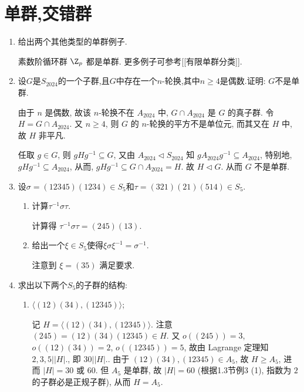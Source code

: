 \section{单群,交错群}
\begin{enumerate}
\item 给出两个其他类型的单群例子.
\begin{solution}
    素数阶循环群 $\Z_p$ 都是单群. 更多例子可参考[[有限单群分类]].
\end{solution}

\item 设$G$是$S_{2024}$的一个子群,且$G$中存在一个$n$-轮换,其中$n \geqslant 4$是偶数.证明: $G$不是单群.
\begin{solution}
    由于 $n$ 是偶数, 故该 $n$-轮换不在 $A_{2024}$ 中,
    $G\cap A_{2024}$ 是 $G$ 的真子群.
    令 $H=G\cap A_{2024}$.
    又 $n\geqslant 4$,
    则 $G$ 的 $n$-轮换的平方不是单位元, 而其又在 $H$ 中,
    故 $H$ 非平凡. 
    
    任取 $g\in G$,
    则 $gHg^{-1}\subseteq G$,
    又由 $A_{2024}\triangleleft S_{2024}$ 知 $gA_{2024}g^{-1}\subseteq A_{2024}$,
    特别地, $gHg^{-1}\subseteq A_{2024}$,
    从而, $gHg^{-1}\subseteq G\cap A_{2024} = H$.
    故 $H\triangleleft G$.
    从而 $G$ 不是单群. 
\end{solution}

\item 设$\sigma = (12345)(1234) \in S_{5}$和$\tau = (321)(21)(514) \in S_{5}$.
\begin{enumerate}[label=(\arabic*)]
\item 计算$\tau^{-1}\sigma\tau$.
\begin{solution}
    计算得 $\tau^{-1}\sigma\tau = (245)(13)$. 
\end{solution}
\item 给出一个$\xi \in S_{5}$使得$\xi\sigma\xi^{-1} = \sigma^{-1}$.
\begin{solution}
    注意到 $\xi = (35)$ 满足要求. 
\end{solution}

\end{enumerate}

\item 求出以下两个$S_{5}$的子群的结构:
\begin{enumerate}[label=(\arabic*)]
\item $\langle (12)(34), (12345) \rangle$;
\begin{solution}
    记 $H=\langle (12)(34), (12345) \rangle$.
    注意 $(245)=(12)(34)(12345) \in H$.
    又 $o\left( (245) \right)=3$, $o\left( (12)(34) \right)=2$, $o\left( (12345) \right)=5$,
    故由 Lagrange 定理知 $2,3,5\bigl| |H| \bigr.$,
    即 $30\bigl| |H| \bigr.$.
    由于 $(12)(34),(12345) \in A_5$,
    故 $H \geqslant A_5$,
    进而 $|H|=30$ 或 $60$.
    但 $A_5$ 是单群, 故 $|H|=60$
    (根据1.3节例3 (1), 指数为 $2$ 的子群必是正规子群),
    从而 $H=A_5$. 
\end{solution}


\end{enumerate}
\end{enumerate}
